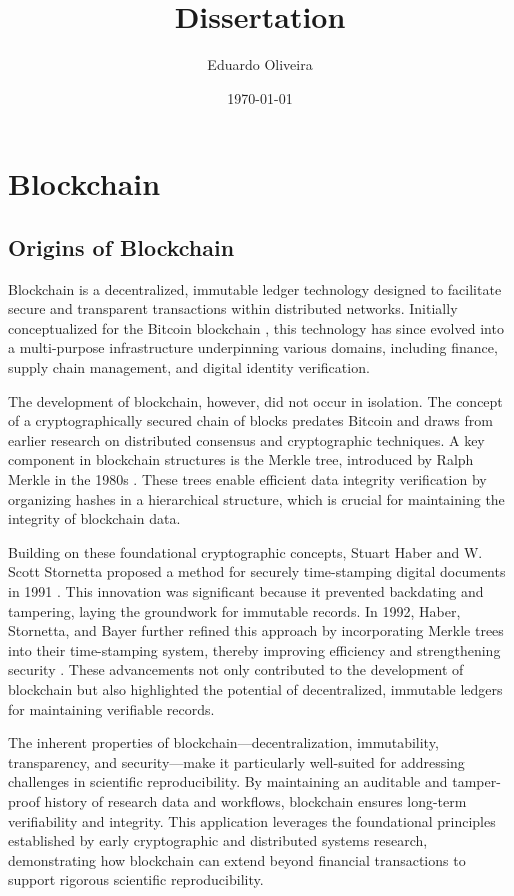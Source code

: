 \documentclass{article}
\title{Dissertation}
\author{Eduardo Oliveira}
\date{\today}
\begin{document}
\maketitle



\section{Blockchain}

\subsection{Origins of Blockchain}

Blockchain is a decentralized, immutable ledger technology designed to facilitate secure and transparent transactions within distributed networks. Initially conceptualized for the Bitcoin blockchain \cite{nakamoto2012bitcoin}, this technology has since evolved into a multi-purpose infrastructure underpinning various domains, including finance, supply chain management, and digital identity verification.

The development of blockchain, however, did not occur in isolation. The concept of a cryptographically secured chain of blocks predates Bitcoin and draws from earlier research on distributed consensus and cryptographic techniques. A key component in blockchain structures is the Merkle tree, introduced by Ralph Merkle in the 1980s \cite{goos_digital_1988}. These trees enable efficient data integrity verification by organizing hashes in a hierarchical structure, which is crucial for maintaining the integrity of blockchain data.

Building on these foundational cryptographic concepts, Stuart Haber and W. Scott Stornetta proposed a method for securely time-stamping digital documents in 1991 \cite{haber_how_1991}. This innovation was significant because it prevented backdating and tampering, laying the groundwork for immutable records. In 1992, Haber, Stornetta, and Bayer further refined this approach by incorporating Merkle trees into their time-stamping system, thereby improving efficiency and strengthening security \cite{bayer_improving_1993}. These advancements not only contributed to the development of blockchain but also highlighted the potential of decentralized, immutable ledgers for maintaining verifiable records.

The inherent properties of blockchain—decentralization, immutability, transparency, and security—make it particularly well-suited for addressing challenges in scientific reproducibility. By maintaining an auditable and tamper-proof history of research data and workflows, blockchain ensures long-term verifiability and integrity. This application leverages the foundational principles established by early cryptographic and distributed systems research, demonstrating how blockchain can extend beyond financial transactions to support rigorous scientific reproducibility.
\end{document}
